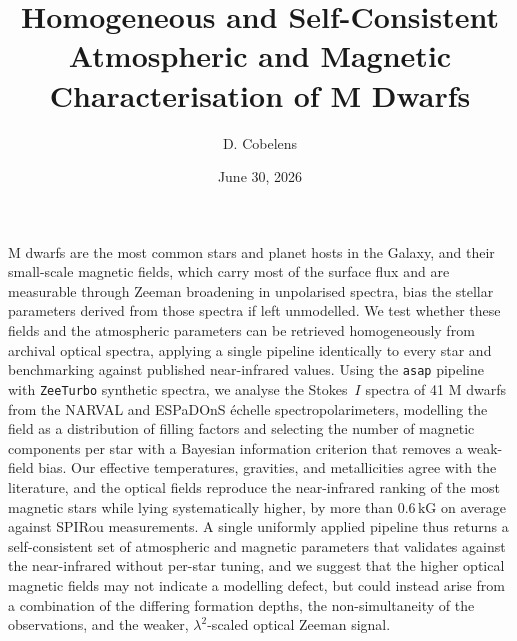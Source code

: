 \documentclass{aa}
\begin{document}
 


   \title{Homogeneous and Self-Consistent Atmospheric and Magnetic Characterisation of M Dwarfs}


   \author{D. Cobelens
          }
          


   \date{June 30, 2026}

 
  \abstract 
   {
   M dwarfs are the most common stars and planet hosts in the Galaxy, and their small-scale magnetic fields, which carry most of the surface flux and are measurable through Zeeman broadening in unpolarised spectra, bias the stellar parameters derived from those spectra if left unmodelled. We test whether these fields and the atmospheric parameters can be retrieved homogeneously from archival optical spectra, applying a single pipeline identically to every star and benchmarking against published near-infrared values. Using the \texttt{asap} pipeline with \texttt{ZeeTurbo} synthetic spectra, we analyse the Stokes~$I$ spectra of 41 M dwarfs from the NARVAL and ESPaDOnS échelle spectropolarimeters, modelling the field as a distribution of filling factors and selecting the number of magnetic components per star with a Bayesian information criterion that removes a weak-field bias. Our effective temperatures, gravities, and metallicities agree with the literature, and the optical fields reproduce the near-infrared ranking of the most magnetic stars while lying systematically higher, by more than $0.6\,\mathrm{kG}$ on average against SPIRou measurements. A single uniformly applied pipeline thus returns a self-consistent set of atmospheric and magnetic parameters that validates against the near-infrared without per-star tuning, and we suggest that the higher optical magnetic fields may not indicate a modelling defect, but could instead arise from a combination of the differing formation depths, the non-simultaneity of the observations, and the weaker, $\lambda^2$-scaled optical Zeeman signal.
  }
   
\end{document}
